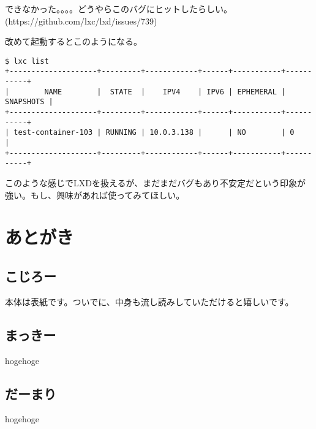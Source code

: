\documentclass[9pt,b5paper,tombo]{jsbook}
\begin{document}
\noindent
できなかった。。。。どうやらこのバグにヒットしたらしい。(https://github.com/lxc/lxd/issues/739)

\noindent
改めて起動するとこのようになる。
\begin{lstlisting}
$ lxc list
+--------------------+---------+------------+------+-----------+-----------+
|        NAME        |  STATE  |    IPV4    | IPV6 | EPHEMERAL | SNAPSHOTS |
+--------------------+---------+------------+------+-----------+-----------+
| test-container-103 | RUNNING | 10.0.3.138 |      | NO        | 0         |
+--------------------+---------+------------+------+-----------+-----------+
\end{lstlisting}

\noindent
このような感じでLXDを扱えるが、まだまだバグもあり不安定だという印象が強い。もし、興味があれば使ってみてほしい。

\chapter{あとがき}

\section{こじろー}
本体は表紙です。ついでに、中身も流し読みしていただけると嬉しいです。

\section{まっきー}

hogehoge

\section{だーまり}

hogehoge

\newpage


\enlargethispage{\paperwidth}
\thispagestyle{empty}
\vspace*{-1truein}
\vspace*{-\topmargin}
\vspace*{-\headheight}
\vspace*{-\headsep}
\vspace*{-\topskip}
\noindent\hspace*{-1in}\hspace*{-\oddsidemargin}
\end{document}

